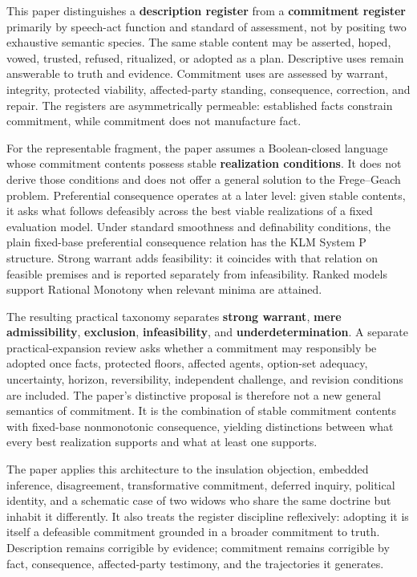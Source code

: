 \documentclass[
  11pt,
]{article}
\begin{document}
This paper distinguishes a \textbf{description register} from a
\textbf{commitment register} primarily by speech-act function and
standard of assessment, not by positing two exhaustive semantic species.
The same stable content may be asserted, hoped, vowed, trusted, refused,
ritualized, or adopted as a plan. Descriptive uses remain answerable to
truth and evidence. Commitment uses are assessed by warrant, integrity,
protected viability, affected-party standing, consequence, correction,
and repair. The registers are asymmetrically permeable: established
facts constrain commitment, while commitment does not manufacture fact.

For the representable fragment, the paper assumes a Boolean-closed
language whose commitment contents possess stable \textbf{realization
conditions}. It does not derive those conditions and does not offer a
general solution to the Frege--Geach problem. Preferential consequence
operates at a later level: given stable contents, it asks what follows
defeasibly across the best viable realizations of a fixed evaluation
model. Under standard smoothness and definability conditions, the plain
fixed-base preferential consequence relation has the KLM System P
structure. Strong warrant adds feasibility: it coincides with that
relation on feasible premises and is reported separately from
infeasibility. Ranked models support Rational Monotony when relevant
minima are attained.

The resulting practical taxonomy separates \textbf{strong warrant},
\textbf{mere admissibility}, \textbf{exclusion}, \textbf{infeasibility},
and \textbf{underdetermination}. A separate practical-expansion review
asks whether a commitment may responsibly be adopted once facts,
protected floors, affected agents, option-set adequacy, uncertainty,
horizon, reversibility, independent challenge, and revision conditions
are included. The paper's distinctive proposal is therefore not a new
general semantics of commitment. It is the combination of stable
commitment contents with fixed-base nonmonotonic consequence, yielding
distinctions between what every best realization supports and what at
least one supports.

The paper applies this architecture to the insulation objection,
embedded inference, disagreement, transformative commitment, deferred
inquiry, political identity, and a schematic case of two widows who
share the same doctrine but inhabit it differently. It also treats the
register discipline reflexively: adopting it is itself a defeasible
commitment grounded in a broader commitment to truth. Description
remains corrigible by evidence; commitment remains corrigible by fact,
consequence, affected-party testimony, and the trajectories it
generates.
\end{document}

